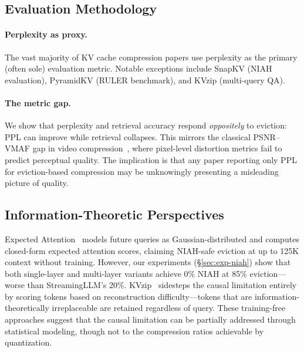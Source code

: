 \subsection{Evaluation Methodology}

\paragraph{Perplexity as proxy.}
The vast majority of KV cache compression papers use perplexity as the primary (often sole) evaluation metric.
Notable exceptions include SnapKV (NIAH evaluation), PyramidKV (RULER benchmark), and KVzip (multi-query QA).

\paragraph{The metric gap.}
We show that perplexity and retrieval accuracy respond \emph{oppositely} to eviction: PPL can improve while retrieval collapses.
This mirrors the classical PSNR--VMAF gap in video compression~\citep{vmaf2016}, where pixel-level distortion metrics fail to predict perceptual quality.
The implication is that any paper reporting only PPL for eviction-based compression may be unknowingly presenting a misleading picture of quality.

\subsection{Information-Theoretic Perspectives}

Expected Attention~\citep{expected-attn-2025} models future queries as Gaussian-distributed and computes closed-form expected attention scores, claiming NIAH-safe eviction at up to 125K context without training. However, our experiments (\S\ref{sec:exp-niah}) show that both single-layer and multi-layer variants achieve 0\% NIAH at 85\% eviction---worse than StreamingLLM's 20\%.
KVzip~\citep{kvzip2025} sidesteps the causal limitation entirely by scoring tokens based on reconstruction difficulty---tokens that are information-theoretically irreplaceable are retained regardless of query.
These training-free approaches suggest that the causal limitation can be partially addressed through statistical modeling, though not to the compression ratios achievable by quantization.
